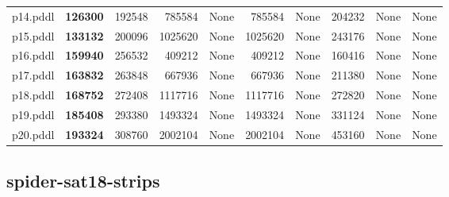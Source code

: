 \documentclass{article}
\begin{document}
\begin{tabular}{@{}lrrrrrrrrr@{}}
p14.pddl & \textbf{126300} & 192548 & 785584 & \multicolumn{1}{|l|}{None} & 785584 & \multicolumn{1}{|l|}{None} & 204232 & \multicolumn{1}{|l|}{None} & \multicolumn{1}{|l|}{None} \\
p15.pddl & \textbf{133132} & 200096 & 1025620 & \multicolumn{1}{|l|}{None} & 1025620 & \multicolumn{1}{|l|}{None} & 243176 & \multicolumn{1}{|l|}{None} & \multicolumn{1}{|l|}{None} \\
p16.pddl & \textbf{159940} & 256532 & 409212 & \multicolumn{1}{|l|}{None} & 409212 & \multicolumn{1}{|l|}{None} & 160416 & \multicolumn{1}{|l|}{None} & \multicolumn{1}{|l|}{None} \\
p17.pddl & \textbf{163832} & 263848 & 667936 & \multicolumn{1}{|l|}{None} & 667936 & \multicolumn{1}{|l|}{None} & 211380 & \multicolumn{1}{|l|}{None} & \multicolumn{1}{|l|}{None} \\
p18.pddl & \textbf{168752} & 272408 & 1117716 & \multicolumn{1}{|l|}{None} & 1117716 & \multicolumn{1}{|l|}{None} & 272820 & \multicolumn{1}{|l|}{None} & \multicolumn{1}{|l|}{None} \\
p19.pddl & \textbf{185408} & 293380 & 1493324 & \multicolumn{1}{|l|}{None} & 1493324 & \multicolumn{1}{|l|}{None} & 331124 & \multicolumn{1}{|l|}{None} & \multicolumn{1}{|l|}{None} \\
p20.pddl & \textbf{193324} & 308760 & 2002104 & \multicolumn{1}{|l|}{None} & 2002104 & \multicolumn{1}{|l|}{None} & 453160 & \multicolumn{1}{|l|}{None} & \multicolumn{1}{|l|}{None} \\
\end{tabular}

\hypertarget{search_start_memory-spider-sat18-strips}{}
\subsection*{spider-sat18-strips}
\end{document}
